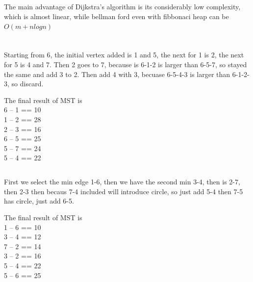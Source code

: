 \documentclass[a4paper]{article}
\begin{document}
\subsection{}
The main advantage of Dijkstra’s algorithm is its considerably low complexity, which is almost linear, while bellman ford even with fibbonaci heap can be $O(m + n log n)$ 
\section{}
\subsection{}
Starting from 6, the initial vertex added is 1 and 5, the next for 1 is 2, the next for 5 is 4 and 7. Then 2 goes to 7, because is 6-1-2 is larger than 6-5-7, so stayed the same and add 3 to 2. Then add 4 with 3, becuase 6-5-4-3 is larger than 6-1-2-3, so discard.

The final result of MST is\\
6 -- 1 == 10\\
1 -- 2 == 28\\
2 -- 3 == 16\\
6 -- 5 == 25\\
5 -- 7 == 24\\
5 -- 4 == 22
\subsection{}
First we select the min edge 1-6, then we have the second min 3-4, then is 2-7, then 2-3 then becaus 7-4 included will introduce circle, so just add 5-4 then 7-5 has circle, just add 6-5.

The final result of MST is \\
1 -- 6 == 10\\
3 -- 4 == 12\\
7 -- 2 == 14\\
3 -- 2 == 16\\
5 -- 4 == 22\\
5 -- 6 == 25
\end{document}
